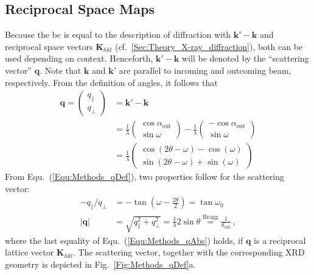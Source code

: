 \subsection{Reciprocal Space Maps}
    \label{Sec:Methods_RSM}
Because the \gls{bc} is equal to the description of diffraction with $\mathbf{k}'-\mathbf{k}$ and reciprocal space vectors $\mathbf{K}_{hkl}$ (cf.~\ref{Sec:Theory_X-ray_diffraction}), both can be used depending on context.
Henceforth, $\mathbf{k}'-\mathbf{k}$ will be denoted by the \enquote{scattering vector} $\mathbf{q}$.
Note that $\mathbf{k}$ and $\mathbf{k}'$ are parallel to incoming and outcoming beam, respectively.
From the definition of angles, it follows that
\begin{align}
    \mathbf{q}
    =\begin{pmatrix}
        q_\parallel\\
        q_\perp
    \end{pmatrix}
    &=\mathbf{k}'-\mathbf{k}\\
    &=\frac{1}{\lambda}
    \begin{pmatrix}
        \cos\alpha_\mathrm{out}\\
        \sin\omega
    \end{pmatrix}
    -\frac{1}{\lambda}
    \begin{pmatrix}
        -\cos\alpha_\mathrm{out}\\
        \sin\omega
    \end{pmatrix}\\
    &=\frac{1}{\lambda}
    \begin{pmatrix}
        \cos(2\theta-\omega)-\cos(\omega)\\
        \sin(2\theta-\omega)+\sin(\omega)
    \end{pmatrix}
    \label{Equ:Methods_qDef}
\end{align}
From Equ.~(\ref{Equ:Methods_qDef}), two properties follow for the scattering vector:
\begin{align}
    -q_\parallel/q_\perp&=-\tan\left(\omega-\frac{2\theta}{2}\right)=\tan\omega_0
        \label{Equ:Methods_qDir}\\
    \left|\mathbf{q}\right|&=\sqrt{q_\parallel^2+q_\perp^2}=\frac{1}{\lambda}2\sin\theta\overset{\mathrm{Bragg}}{=}\frac{1}{d_{hkl}}\,,
    \label{Equ:Methods_qAbs}
\end{align}
where the last equality of Equ.~(\ref{Equ:Methods_qAbs}) holds, if $\mathbf{q}$ is a reciprocal lattice vector $\mathbf{K}_{hkl}$.
The scattering vector, together with the corresponding \gls{XRD} geometry is depicted in Fig.~\ref{Fig:Methods_qDef}a.
